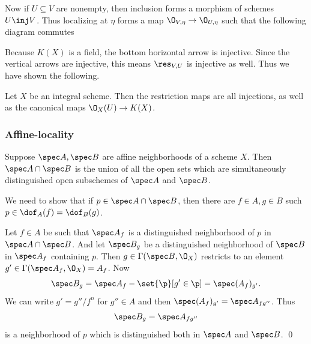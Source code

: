 Now if $U\subseteq V$ are nonempty, then inclusion forms a morphism of schemes $U\inj V$.
Thus localizing at $\eta$ forms a map $\O_{V,\eta}\to\O_{U,\eta}$ such that the following diagram commutes


Because $K(X)$ is a field, the bottom horizontal arrow is injective.
Since the vertical arrows are injective, this means $\res_{V,U}$ is injective as well.
Thus we have shown the following.

\bprop

    Let $X$ be an integral scheme.
    Then the restriction maps are all injections, as well as the canonical maps $\O_X(U)\to K(X)$.

\eprop

\subsubsection{Affine-locality}

\bprop[name={affineinter}]

    Suppose $\spec A,\spec B$ are affine neighborhoods of a scheme $X$.
    Then $\spec A\cap\spec B$ is the union of all the open sets which are simultaneously distinguished open subschemes of $\spec A$ and $\spec B$.

\eprop

\bproof

    We need to show that if $p\in\spec A\cap\spec B$, then there are $f\in A,g\in B$ such $p\in\dof_A(f)=\dof_B(g)$.

    Let $f\in A$ be such that $\spec A_f$ is a distinguished neighborhood of $p$ in $\spec A\cap\spec B$.
    And let $\spec B_g$ be a distinguished neighborhood of $\spec B$ in $\spec A_f$ containing $p$.
    Then $g\in\Gamma(\spec B,\O_X)$ restricts to an element $g'\in\Gamma(\spec A_f,\O_X)=A_f$.
    Now
    $$ \spec B_g = \spec A_f - \set{\p}[g'\in\p] = \spec (A_f)_{g'} . $$
    We can write $g'=g''/f^n$ for $g''\in A$ and then $\spec(A_f)_{g'}=\spec A_{fg''}$.
    Thus
    $$ \spec B_g = \spec A_{fg''} $$
    is a neighborhood of $p$ which is distinguished both in $\spec A$ and $\spec B$.
    \qed

